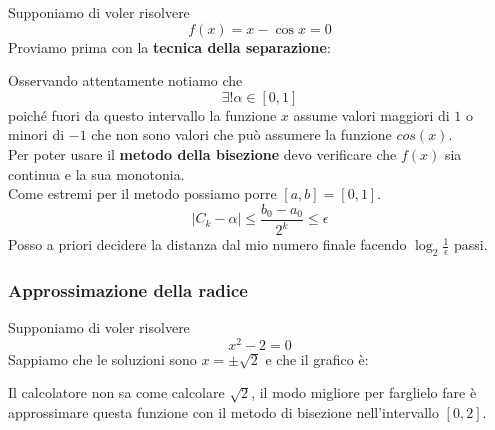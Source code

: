 \begin{example}
	Supponiamo di voler risolvere
	\begin{equation*}
		f(x)=x-\cos x = 0
	\end{equation*}
	\newpage
	Proviamo prima con la \textbf{tecnica della separazione}:
	\begin{center}
	\end{center}
	Osservando  attentamente notiamo che
	\begin{equation*}
		\exists ! \alpha \in [0,1]
	\end{equation*}
	poiché fuori da questo intervallo la funzione $x$ assume valori maggiori di $1$ o minori di $-1$ che non sono valori che può assumere la funzione $cos(x)$.\\
	Per poter usare il \textbf{metodo della bisezione} devo verificare che $f(x)$ sia continua e la sua monotonia.\\
	Come estremi per il metodo possiamo porre $[a,b]=[0,1]$.
	\begin{equation*}
		\lvert C_k - \alpha \rvert \leq \frac{b_0 - a_0}{2^k} \leq \epsilon
	\end{equation*}
	Posso a priori decidere la distanza dal mio numero finale facendo $\log_2 \frac{1}{\epsilon}$ passi.
\end{example}

\subsubsection{Approssimazione della radice}
Supponiamo di voler risolvere
\begin{equation*}
	x^2-2=0
\end{equation*}
Sappiamo che le soluzioni sono $x=\pm \sqrt{2}$ e che il grafico è:
\begin{center}
\end{center}
Il calcolatore non sa come calcolare $\sqrt{2}$, il modo migliore per farglielo fare è approssimare questa funzione con il metodo di bisezione nell'intervallo $[0,2]$.

